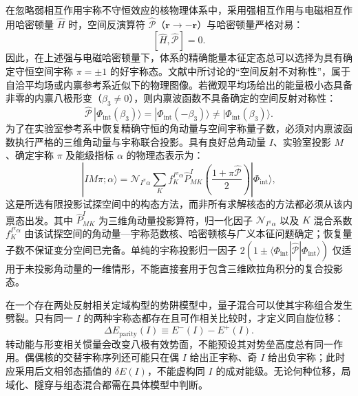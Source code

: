 在忽略弱相互作用宇称不守恒效应的核物理体系中，采用强相互作用与电磁相互作用哈密顿量 $\hat{H}$ 时，空间反演算符 $\hat{\mathcal{P}}$（$\mathbf{r} \to -\mathbf{r}$）与哈密顿量严格对易：
\begin{equation}\label{eq:4-5-parity-commute}
[\hat{H}, \hat{\mathcal{P}}] = 0.
\end{equation}
因此，在上述强与电磁哈密顿量下，体系的精确能量本征定态总可以选择为具有确定守恒空间宇称 $\pi = \pm 1$ 的好宇称态。文献中所讨论的“空间反射不对称性”，属于自洽平均场或内禀参考系近似下的物理图像。若微观平均场给出的能量极小态具备非零的内禀八极形变（$\beta_3 \neq 0$），则内禀波函数不具备确定的空间反射对称性：
\begin{equation}\label{eq:4-5-intrinsic-parity-breaking}
\hat{\mathcal{P}}\,|\Phi_{\mathrm{int}}(\beta_3)\rangle = |\Phi_{\mathrm{int}}(-\beta_3)\rangle \neq |\Phi_{\mathrm{int}}(\beta_3)\rangle .
\end{equation}
为了在实验室参考系中恢复精确守恒的角动量与空间宇称量子数，必须对内禀波函数执行严格的三维角动量与宇称联合投影。具有良好总角动量 $I$、实验室投影 $M$、确定宇称 $\pi$ 及能级指标 $\alpha$ 的物理态表示为：
\begin{equation}\label{eq:4-5-parity-projection}
|I M \pi; \alpha\rangle = \mathcal{N}_{I^\pi \alpha} \sum_K f_K^{I^\pi \alpha} \hat{P}_{MK}^I \left( \frac{1 + \pi \hat{\mathcal{P}}}{2} \right) |\Phi_{\mathrm{int}}\rangle ,
\end{equation}
这是所选有限投影试探空间中的构态方法，而非所有求解核态的方法都必须从该内禀态出发。其中 $\hat{P}_{MK}^I$ 为三维角动量投影算符，归一化因子 $\mathcal{N}_{I^\pi \alpha}$ 以及 $K$ 混合系数 $f_K^{I^\pi \alpha}$ 由该试探空间的角动量---宇称范数核、哈密顿核与广义本征问题确定；恢复量子数不保证变分空间已完备。单纯的宇称投影归一因子 $2(1 \pm \langle \Phi_{\mathrm{int}} | \hat{\mathcal{P}} | \Phi_{\mathrm{int}} \rangle)$ 仅适用于未投影角动量的一维情形，不能直接套用于包含三维欧拉角积分的复合投影态。

在一个存在两处反射相关定域构型的势阱模型中，量子混合可以使其宇称组合发生劈裂。只有同一 $I$ 的两种宇称态都存在且可作相关比较时，才定义同自旋位移：
\begin{equation}\label{eq:4-5-parity-gap}
\Delta E_{\text{parity}}(I) \equiv E^-(I) - E^+(I).
\end{equation}
转动能与形变相关惯量会改变八极有效势面，不能预设其对势垒高度总有同一作用。偶偶核的交替宇称序列还可能只在偶 $I$ 给出正宇称、奇 $I$ 给出负宇称；此时应采用后文相邻态插值的 $\delta E(I)$，不能虚构同 $I$ 的成对能级。无论何种位移，局域化、隧穿与组态混合都需在具体模型中判断。

